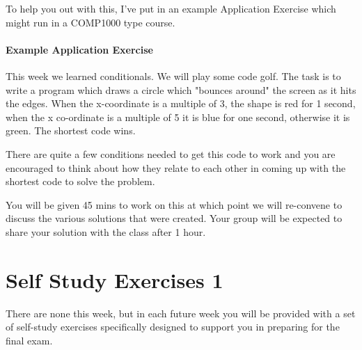 \documentclass[twoside=false,DIV=14]{scrartcl}
\begin{document}
To help you out with this, I've put in an example Application Exercise which might run in a COMP1000 type course.

\begin{note}
\subsection*{Example Application Exercise}
This week we learned conditionals.  We will play some code golf.  The task is to write a program which draws a circle which "bounces around" the screen as it hits the edges.  When the x-coordinate is a multiple of 3, the shape is red for 1 second, when the x co-ordinate is a multiple of 5 it is blue for one second, otherwise it is green.  The shortest code wins.

There are quite a few conditions needed to get this code to work and you are encouraged to think about how they relate to each other in coming up with the shortest code to solve the problem.

You will be given 45 mins to work on this at which point we will re-convene to discuss the various solutions that were created.  Your group will be expected to share your solution with the class after 1 hour.
\end{note}

\newpage
\part*{Self Study Exercises 1}

There are none this week, but in each future week you will be provided with a set of self-study exercises specifically designed to support you in preparing for the final exam.
\end{document}
